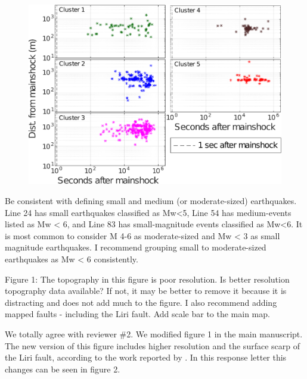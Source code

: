 \documentclass[10pt]{extarticle}
\begin{document}
\begin{Answer}
\begin{figure}[!h]
\begin{center}
 \includegraphics[width=0.7\linewidth]{S3_loglog_time.png} 
\end{center}
\end{figure}
 \WorkInProgressRevTask
\end{Answer}
%
%




\begin{ReviewerComment}{2}
\noindent 
Be consistent with defining small and medium (or moderate-sized) earthquakes. Line 24 has small earthquakes classified as  Mw<5, Line 54 has medium-events listed as Mw < 6, and Line 83 has small-magnitude events classified as Mw<6. It is most common to consider M 4-6 as moderate-sized and Mw < 3 as small magnitude earthquakes. I recommend grouping small to moderate-sized earthquakes as Mw < 6 consistently.

\end{ReviewerComment}


\begin{Answer}
 \WorkInProgressRevTask
\end{Answer}
%
%




\begin{ReviewerComment}{2}
\noindent 
Figure 1: The topography in this figure is poor resolution. Is better resolution topography data available? If not, it may be better to remove it because it is distracting and does not add much to the figure. I also recommend adding mapped faults - including the Liri fault. Add scale bar to the main map.

\end{ReviewerComment}


\begin{Answer}
We totally agree with reviewer \#2. We modified figure 1 in the main manuscript. The new version of this figure includes higher resolution and the surface scarp of the Liri fault, according to the work reported by \cite{wedmore2017667}. In this response letter this changes can be seen in figure 2.
 \WorkInProgressRevTask
\end{Answer}
%
%
\end{document}
